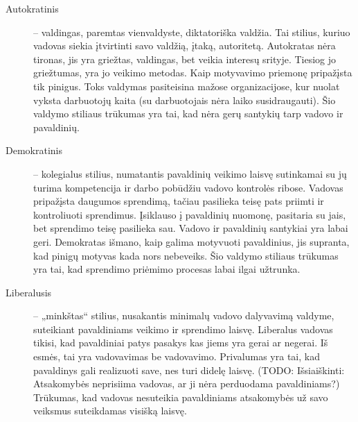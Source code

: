\begin{description}
  \item[Autokratinis] – valdingas, paremtas vienvaldyste, diktatoriška
    valdžia. Tai stilius, kuriuo vadovas siekia įtvirtinti savo valdžią,
    įtaką, autoritetą. Autokratas nėra tironas, jis yra griežtas,
    valdingas, bet veikia interesų srityje. Tiesiog jo griežtumas, yra
    jo veikimo metodas. Kaip motyvavimo priemonę pripažįsta tik pinigus.
    Toks valdymas pasiteisina mažose organizacijose, kur nuolat vyksta
    darbuotojų kaita (su darbuotojais nėra laiko susidraugauti).
    Šio valdymo stiliaus trūkumas yra tai, kad nėra gerų santykių
    tarp vadovo ir pavaldinių.
  \item[Demokratinis] – kolegialus stilius, numatantis pavaldinių
    veikimo laisvę sutinkamai su jų turima kompetencija ir darbo
    pobūdžiu vadovo kontrolės ribose. Vadovas pripažįsta daugumos
    sprendimą, tačiau pasilieka teisę pats priimti ir kontroliuoti
    sprendimus. Įsiklauso į pavaldinių nuomonę, pasitaria su jais,
    bet sprendimo teisę pasilieka sau. Vadovo ir pavaldinių
    santykiai yra labai geri. Demokratas išmano, kaip galima
    motyvuoti pavaldinius, jis supranta, kad pinigų motyvas kada
    nors nebeveiks. Šio valdymo stiliaus trūkumas yra tai, kad
    sprendimo priėmimo procesas labai ilgai užtrunka.
  \item[Liberalusis] – „minkštas“ stilius, nusakantis minimalų vadovo
    dalyvavimą valdyme, suteikiant pavaldiniams veikimo ir sprendimo
    laisvę. Liberalus vadovas tikisi, kad pavaldiniai patys pasakys
    kas jiems yra gerai ar negerai. Iš esmės, tai yra vadovavimas be
    vadovavimo. Privalumas yra tai, kad pavaldinys gali realizuoti
    save, nes turi didelę laisvę. (TODO: Išsiaiškinti: Atsakomybės
    neprisiima vadovas, ar ji nėra perduodama pavaldiniams?) Trūkumas,
    kad vadovas nesuteikia pavaldiniams atsakomybės už savo veiksmus
    suteikdamas visišką laisvę.
\end{description}

